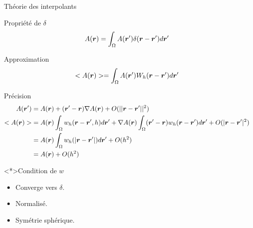 \begin{frame}[<+->][shrink]{Théorie des interpolants}
\begin{block}{Propriété de $\delta$}
  \begin{equation*}
 A({\boldsymbol {r}})=\int_{\Omega} A({\boldsymbol {r}}')\delta({\boldsymbol {r}}-{\boldsymbol {r}}')d{\boldsymbol {r}}'
 \end{equation*}
\end{block}

\begin{block}{Approximation}
\begin{equation*}
 <A({\boldsymbol {r}})>=\int_{\Omega} A({\boldsymbol {r}}')W_h({\boldsymbol {r}}-{\boldsymbol {r}}')d{\boldsymbol {r}}'
 \end{equation*}
\end{block}

\begin{block}{Précision}
 \begin{align*}
  A({\boldsymbol {r}}')&=A({\boldsymbol {r}})+({\boldsymbol {r}}'-{\boldsymbol {r}})\nabla A({\boldsymbol {r}})+O(||{\boldsymbol {r}}-{\boldsymbol {r}}'||^2)\\
  <A({\boldsymbol {r}})>&=A({\boldsymbol {r}})\int_{\Omega}w_{h}({\boldsymbol {r}}-{\boldsymbol {r}}',h)d{\boldsymbol {r}}'+\nabla A({\boldsymbol {r}})\int_{\Omega}({\boldsymbol {r}}'-{\boldsymbol {r}})w_{h}({\boldsymbol {r}}-{\boldsymbol {r}}')d{\boldsymbol {r}}'+O(|{\boldsymbol {r}}-{\boldsymbol {r}}'|^2)\\
  &=A({\boldsymbol {r}})\int_{\Omega} w_{h}(|{\boldsymbol {r}}-{\boldsymbol {r}}'|)d{\boldsymbol {r}}'+O(h^2)\\
  &=A({\boldsymbol {r}})+O(h^2)\\
 \end{align*}
\end{block}

\begin{block}<*>{Condition de $w$}
\begin{itemize}
 \item Converge vers $\delta$.
 \item Normalisé.
 \item Symétrie sphérique.
\end{itemize}
\end{block}

 
\end{frame}
